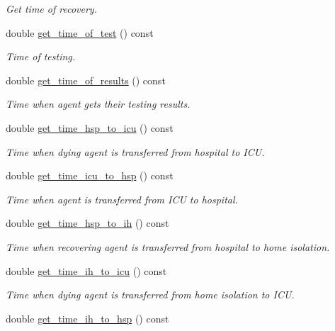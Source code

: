 \begin{DoxyCompactItemize}
\begin{DoxyCompactList}\small\item\em Get time of recovery. \end{DoxyCompactList}\item 
double \hyperlink{classAgent_a7f6b8aca348488cb00b0b4a5356be717}{get\+\_\+time\+\_\+of\+\_\+test} () const
\begin{DoxyCompactList}\small\item\em Time of testing. \end{DoxyCompactList}\item 
double \hyperlink{classAgent_ae08afdbb10607a67d1b456e3660dc542}{get\+\_\+time\+\_\+of\+\_\+results} () const
\begin{DoxyCompactList}\small\item\em Time when agent gets their testing results. \end{DoxyCompactList}\item 
double \hyperlink{classAgent_a65a7778e48d9a031012bd5b2cbee785f}{get\+\_\+time\+\_\+hsp\+\_\+to\+\_\+icu} () const
\begin{DoxyCompactList}\small\item\em Time when dying agent is transferred from hospital to I\+CU. \end{DoxyCompactList}\item 
double \hyperlink{classAgent_ae3b4045c981c44fb9eeed130246ea0a6}{get\+\_\+time\+\_\+icu\+\_\+to\+\_\+hsp} () const
\begin{DoxyCompactList}\small\item\em Time when agent is transferred from I\+CU to hospital. \end{DoxyCompactList}\item 
double \hyperlink{classAgent_a4dbb9d37122f7524d7122dab8cbe54b5}{get\+\_\+time\+\_\+hsp\+\_\+to\+\_\+ih} () const
\begin{DoxyCompactList}\small\item\em Time when recovering agent is transferred from hospital to home isolation. \end{DoxyCompactList}\item 
double \hyperlink{classAgent_ac5987a030791b1d5dd9345cad1b21164}{get\+\_\+time\+\_\+ih\+\_\+to\+\_\+icu} () const
\begin{DoxyCompactList}\small\item\em Time when dying agent is transferred from home isolation to I\+CU. \end{DoxyCompactList}\item 
double \hyperlink{classAgent_af2739d7acc0712cb090fff1d35f6169d}{get\+\_\+time\+\_\+ih\+\_\+to\+\_\+hsp} () const

\end{DoxyCompactItemize}
